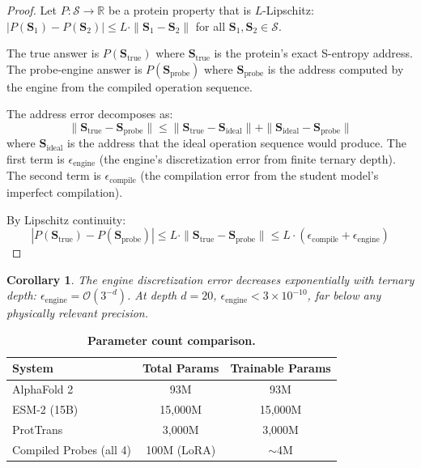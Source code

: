 \documentclass[11pt,twocolumn,a4paper]{article}
\newtheorem{corollary}[theorem]{Corollary}
\theoremstyle{definition}
\theoremstyle{remark}
\newcommand{\Sspace}{\mathcal{S}}
\newcommand{\Scoord}{\mathbf{S}}
\newcommand{\R}{\mathbb{R}}
\begin{document}
\begin{proof}
Let $P: \Sspace \to \R$ be a protein property that is $L$-Lipschitz: $|P(\Scoord_1) - P(\Scoord_2)| \leq L \cdot \|\Scoord_1 - \Scoord_2\|$ for all $\Scoord_1, \Scoord_2 \in \Sspace$.

The true answer is $P(\Scoord_{\text{true}})$ where $\Scoord_{\text{true}}$ is the protein's exact S-entropy address. The probe-engine answer is $P(\Scoord_{\text{probe}})$ where $\Scoord_{\text{probe}}$ is the address computed by the engine from the compiled operation sequence.

The address error decomposes as:
\begin{equation}
\|\Scoord_{\text{true}} - \Scoord_{\text{probe}}\| \leq \|\Scoord_{\text{true}} - \Scoord_{\text{ideal}}\| + \|\Scoord_{\text{ideal}} - \Scoord_{\text{probe}}\|
\end{equation}
where $\Scoord_{\text{ideal}}$ is the address that the ideal operation sequence would produce. The first term is $\epsilon_{\text{engine}}$ (the engine's discretization error from finite ternary depth). The second term is $\epsilon_{\text{compile}}$ (the compilation error from the student model's imperfect compilation).

By Lipschitz continuity:
\begin{equation}
|P(\Scoord_{\text{true}}) - P(\Scoord_{\text{probe}})| \leq L \cdot \|\Scoord_{\text{true}} - \Scoord_{\text{probe}}\| \leq L \cdot (\epsilon_{\text{compile}} + \epsilon_{\text{engine}})
\end{equation}
\end{proof}

\begin{corollary}
The engine discretization error decreases exponentially with ternary depth: $\epsilon_{\text{engine}} = \mathcal{O}(3^{-d})$. At depth $d = 20$, $\epsilon_{\text{engine}} < 3 \times 10^{-10}$, far below any physically relevant precision.
\end{corollary}

\begin{table}[H]
\centering
\caption{\textbf{Parameter count comparison.}}
\label{tab:parameters}
\begin{tabular}{@{}lcc@{}}
\toprule
\textbf{System} & \textbf{Total Params} & \textbf{Trainable Params} \\
\midrule
AlphaFold 2 & 93M & 93M \\
ESM-2 (15B) & 15,000M & 15,000M \\
ProtTrans & 3,000M & 3,000M \\
Compiled Probes (all 4) & 100M (LoRA) & $\sim$4M \\
\bottomrule
\end{tabular}
\end{table}
\end{document}
